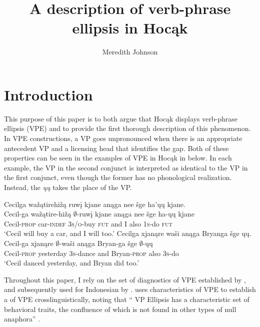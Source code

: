 \documentclass[output=paper]{LSP/langsci}
\author{Meredith Johnson}
\title{A description of verb-phrase ellipsis in {Hocąk}}
\begin{document}
\section{Introduction}\label{sec:johnson:1}

 
This purpose of this paper is to both argue that Hocąk displays verb-phrase ellipsis (VPE) and to provide the first thorough description of this phenomenon. In VPE constructions, a VP goes unpronounced when there is an appropriate antecedent VP and a licensing head that identifies the gap. Both of these properties can be seen in the examples of VPE in Hocąk in  below. In each example, the VP in the second conjunct is interpreted as identical to the VP in the first conjunct, even though the former has no phonological realization. Instead, the  \emph{ųų} takes the place of the VP.
 


\ea\label{ex:johnson:1}
\ea
\glll Cecilga {\ob}{\sVP} wažątirehižą ruwį{\cb} kjane anąga nee šge {\ob}ha'ųų{\cb} kjane.\\
Cecil-ga {} wažątire-hižą {$\emptyset$}-ruwį kjane anąga nee šge ha-ųų kjane\\
Cecil-\textsc{prop} {} car-\textsc{indef} \textsc{3s/o}-buy \textsc{fut} and I also \textsc{1s}-do \textsc{fut}\\
\trans `Cecil will buy a car, and I will too.' 
\ex
\glll Cecilga {\ob}{\sVP} xjanąre waši{\cb} anąga Bryanga šge {\ob}ųų{\cb}.\\
Cecil-ga {} xjanąre {$\emptyset$}-waši anąga Bryan-ga šge {$\emptyset$}-ųų\\
Cecil-\textsc{prop} {} yesterday \textsc{3s}-dance and Bryan-\textsc{prop} also \textsc{3s}-do\\
\trans `Cecil danced yesterday, and Bryan did too.'
\z
\z

Throughout this paper, I rely on the set of diagnostics of VPE established by \citet{Goldberg2005}, and subsequently used for Indonesian by \citet{Fortin2007}. \citet{Goldberg2005} uses characteristics of  VPE to establish a  of VPE crosslinguistically, noting that `` VP Ellipsis has a characteristic set of behavioral traits, the confluence of which is not found in other types of null anaphora'' \citep[27]{Goldberg2005}. 
\end{document}
